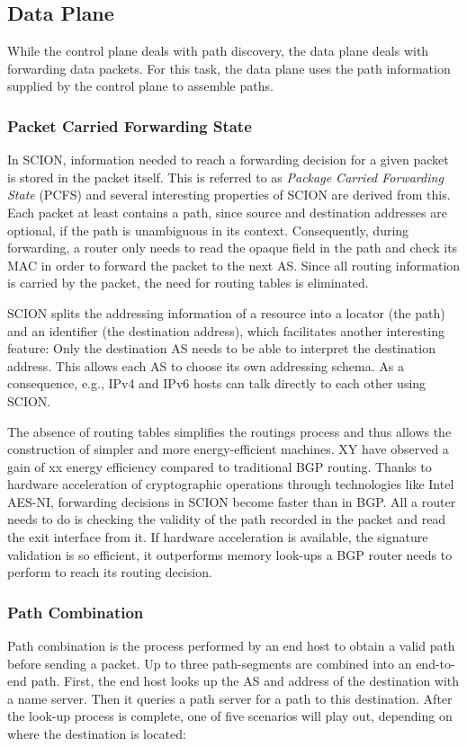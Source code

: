 \documentclass[../eva1_scion.tex]{subfiles}
\begin{document}
    \subsection{Data Plane} \label{ssec:data_plane}
    While the control plane deals with path discovery, the data plane deals with forwarding data packets. For this task, the data plane uses the path information supplied by the control plane to assemble paths.

    \subsubsection{Packet Carried Forwarding State}\label{sssec:pcfs}
    In SCION, information needed to reach a forwarding decision for a given packet is stored in the packet itself. This is referred to as \textit{Package Carried Forwarding State} (PCFS) and several interesting properties of SCION are derived from this. Each packet at least contains a path, since source and destination addresses are optional, if the path is unambiguous in its context. Consequently, during forwarding, a router only needs to read the opaque field in the path and check its MAC in order to forward the packet to the next AS. Since all routing information is carried by the packet, the need for routing tables is eliminated.

    SCION splits the addressing information of a resource into a locator (the path) and an identifier (the destination address), which facilitates another interesting feature: Only the destination AS needs to be able to interpret the destination address. This allows each AS to choose its own addressing schema. As a consequence,   e.g., IPv4 and IPv6 hosts can talk directly to each other using SCION.

    The absence of routing tables simplifies the routings process and thus allows the construction of simpler and more energy-efficient machines. XY have observed a gain of xx  energy efficiency compared to traditional BGP routing. Thanks to hardware acceleration of cryptographic operations through technologies like Intel AES-NI, forwarding decisions in SCION become faster than in BGP. All a router needs to do is checking the validity of the path recorded in the packet and read the exit interface from it. If hardware acceleration is available, the signature validation is so efficient, it outperforms memory look-ups a BGP router needs to perform to reach its routing decision. 

    \subsubsection{Path Combination} \label{sssec:path_assembly}
    Path combination is the process performed by an end host to obtain a valid path before sending a packet. Up to three path-segments are combined into an end-to-end path. First, the end host looks up the AS and address of the destination with a name server. Then it queries a path server for a path to this destination. After the look-up process is complete, one of five scenarios will play out, depending on where the destination is located:
\end{document}
